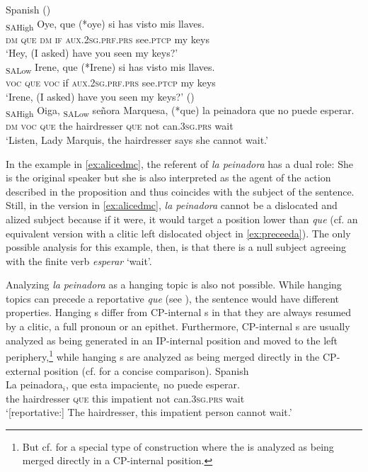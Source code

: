 \ea \label{ex:alicedms} Spanish
\ea\label{ex:alicedma}
  (\citealt[182: ex 66]{Corr2016})\\ 
\gll  {\ob}\textsubscript{SAHigh} Oye{\cb}, que  (*oye) si  has visto mis llaves. \\
{} \textsc{dm} \textsc{que} \textsc{dm} \textsc{if} \textsc{aux.2sg.prf.prs} see.\textsc{ptcp} my keys\\
\glt `Hey, (I asked) have you seen my keys?'
\ex\label{ex:alicedmb}
\citet[182: ex 67]{Corr2016}\\
\gll {\ob}\textsubscript{SALow} Irene{\cb}, que (*Irene) si has visto mis llaves. \\
 {} \textsc{voc} \textsc{que} \textsc{voc} if \textsc{aux.2sg.prf.prs} see.\textsc{ptcp} my keys\\
\glt `Irene, (I asked) have you seen my keys?'  
\ex\label{ex:alicedmc}
(\citealt[182–183: ex 70]{Corr2016})\\
\gll {\ob}\textsubscript{SAHigh} Oiga{\cb}, {\ob}\textsubscript{SALow} señora Marquesa{\cb}, (*que) la peinadora que no puede esperar. \\
{} \textsc{dm} {}  \textsc{voc} {} \textsc{que} the hairdresser \textsc{que} not can.\textsc{3sg.prs} wait\\
\glt `Listen, Lady Marquis, the hairdresser says she cannot wait.'
\z
\z

In the example in \eqref{ex:alicedmc}, the referent of \emph{la peinadora} has a dual role: She is the original speaker but  she is also interpreted as the agent of the action  described in the proposition and thus coincides with the subject of the sentence.  Still, in the version  in \eqref{ex:alicedmc}, \emph{la peinadora} cannot be a dislocated and alized subject because if it were, it would target a position lower than \emph{que} (cf. an equivalent version with a clitic left dislocated object in \eqref{ex:preceeda}). The only possible analysis for this example, then, is that there is a null subject agreeing with the finite verb \emph{esperar} `wait'.\largerpage

Analyzing \emph{la peinadora} as a  hanging topic is also not possible. While hanging topics can  precede a reportative \emph{que} (see   ), the sentence would have different properties. Hanging s differ from CP-internal s in that they are always resumed by a clitic, a full pronoun or an epithet. Furthermore,  CP-internal s are usually analyzed as being generated in an IP-internal position and  moved to the left periphery,\footnote{But cf. \citet{VillaGarcia2015} for a special type of  construction where the  is analyzed as being merged directly in a CP-internal position.} while hanging s are analyzed as being merged directly in the CP-external position (cf. \citealt[165]{VillaGarcia2015} for a concise comparison).  
\ea\label{ex:impaciente} Spanish \\ \gll La peinadora$_i$, que esta impaciente$_i$ no puede esperar.\\
the hairdresser \textsc{que} this impatient not can.\textsc{3sg.prs} wait\\
\glt `[reportative:] The hairdresser, this impatient person cannot wait.' 
\z
 
